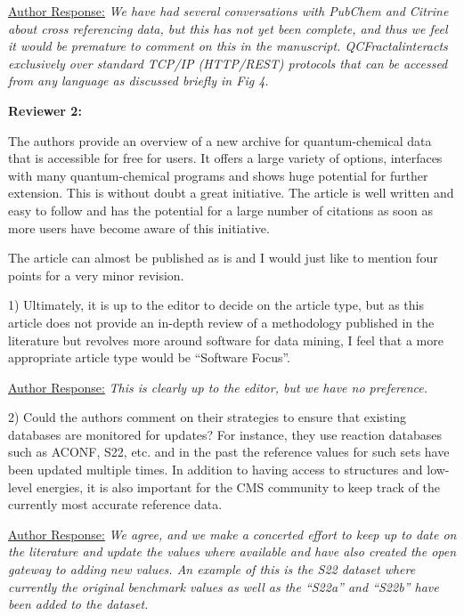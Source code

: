 \documentclass[12pt]{article}
\newcommand{\qcfN}{QCFractal}
\begin{document}
\noindent \underline{Author Response:} \textit{We have had several
conversations with PubChem and Citrine about cross referencing data, but this
has not yet been complete, and thus we feel it would be premature to comment
on this in the manuscript.  \qcfN interacts exclusively over standard
TCP/IP (HTTP/REST) protocols that can be accessed from any language as
discussed briefly in Fig 4.}

\noindent\makebox[\linewidth]{\rule{\linewidth}{0.4pt}}

\noindent
\textbf{Reviewer 2:}

\noindent
The authors provide an overview of a new archive for quantum-chemical data that is accessible for free for users. It offers a large variety of options, interfaces with many quantum-chemical programs and shows huge potential for further extension. This is without doubt a great initiative. The article is well written and easy to follow and has the potential for a large number of citations as soon as more users have become aware of this initiative. 

\noindent
The article can almost be published as is and I would just like to mention four points for a very minor revision.

1) Ultimately, it is up to the editor to decide on the article type, but as this article does not provide an in-depth review of a methodology published in the literature but revolves more around software for data mining, I feel that a more appropriate article type would be “Software Focus”.

\noindent \underline{Author Response:} \textit{This is clearly up to the
editor, but we have no preference.}

2) Could the authors comment on their strategies to ensure that existing databases are monitored for updates? For instance, they use reaction databases such as ACONF, S22, etc. and in the past the reference values for such sets have been updated multiple times. In addition to having access to structures and low-level energies, it is also important for the CMS community to keep track of the currently most accurate reference data.

\noindent \underline{Author Response:} \textit{We agree, and we make a
concerted effort to keep up to date on the literature and update the values
where available and have also created the open gateway to adding new values.
An example of this is the S22 dataset where currently the original benchmark
values as well as the ``S22a'' and ``S22b'' have been added to the dataset.}
\end{document}
